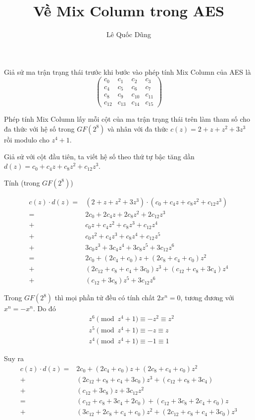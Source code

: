 \documentclass{article}
\title{Về Mix Column trong AES}
\author{Lê Quốc Dũng}
\begin{document}
Giả sử ma trận trạng thái trước khi bước vào phép tính Mix Column của AES
là 
\begin{equation}
    \begin{pmatrix}
        c_0 & c_1 & c_2 & c_3 \\
        c_4 & c_5 & c_6 & c_7 \\
        c_8 & c_9 & c_{10} & c_{11} \\
        c_{12} & c_{13} & c_{14} & c_{15}
    \end{pmatrix}
\end{equation}

Phép tính Mix Column lấy mỗi cột của ma trận trạng thái trên làm tham số cho đa thức
với hệ số trong $GF(2^8)$ và nhân với đa thức $c(z) = 2 + z + z^2 + 3z^3$ rồi modulo
cho $z^4 + 1$.

Giả sử với cột đầu tiên, ta viết hệ số theo thứ tự bậc tăng dần
$d(z) = c_0 + c_4 z + c_8 z^2 + c_{12} z^3$.

Tính (trong $GF(2^8)$)

\begin{align*}
    c(z) \cdot d(z) = & (2 + z + z^2 + 3 z^3) \cdot (c_0 + c_4 z + c_8 z^2 + c_{12} z^3) \\
    = & 2 c_0 + 2 c_4 z + 2 c_8 z^2 + 2 c_{12} z^3 \\
    + & c_0 z + c_4 z^2 + c_8 z^3 + c_{12} z^4 \\
    + & c_0 z^2 + c_4 z^3 + c_8 z^4 + c_{12} z^5 \\
    + & 3 c_0 z^3 + 3 c_4 z^4 + 3 c_8 z^5 + 3 c_{12} z^6 \\
    = & 2 c_0 + (2 c_4 + c_0) z + (2 c_8 + c_4 + c_0) z^2 \\
    + & (2 c_{12} + c_8 + c_4 + 3 c_0) z^3 + (c_{12} + c_8 + 3 c_4) z^4 \\
    + & (c_{12} + 3 c_8) z^5 + 3 c_{12} z^6
\end{align*}

Trong $GF(2^8)$ thì mọi phần tử đều có tính chất $2 x^n = 0$, tương đương với
$x^n = -x^n$. Do đó 
\begin{align*}
    & z^6 \pmod{z^4 + 1} \equiv -z^2 \equiv z^2 \\
    & z^5 \pmod{z^4 + 1} \equiv -z \equiv z \\
    & z^4 \pmod{z^4 + 1} \equiv -1 \equiv 1
\end{align*}

Suy ra
\begin{align*}
    c(z) \cdot d(z) = & 2 c_0 + (2 c_4 + c_0) z + (2 c_8 + c_4 + c_0) z^2 \\
    + & (2 c_{12} + c_8 + c_4 + 3 c_0) z^3 + (c_{12} + c_8 + 3 c_4) \\
    + & (c_{12} + 3 c_8) z + 3 c_{12} z^2 \\
    = & (c_{12} + c_8 + 3 c_4 + 2 c_0) + (c_{12} + 3 c_8 + 2 c_4 + c_0) z \\
    + & (3 c_{12} + 2 c_8 + c_4 + c_0) z^2 + (2 c_{12} + c_8 + c_4 + 3 c_0) z^3
\end{align*}
\end{document}
